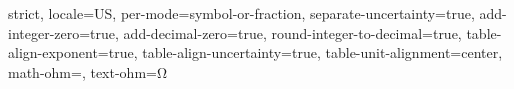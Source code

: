 \NewDocumentCommand \mathdefault {}
{
  \mathit
}



\setlength{\delimitershortfall}{-1sp}

\setlength{\IEEEnormaljot}{10pt}

\sisetup
{
  strict,
  locale=US,
  per-mode=symbol-or-fraction,
  separate-uncertainty=true,
  add-integer-zero=true,
  add-decimal-zero=true,
  round-integer-to-decimal=true,
  table-align-exponent=true,
  table-align-uncertainty=true,
  table-unit-alignment=center,
  math-ohm=\mathup{\Omega},
  text-ohm=\ensuremath{\mathup{\Omega}}
}




\nocite{numpy, scipy, matplotlib, uncertainties, root, roofit}

\NewDocumentCommand \makebibliography {}
{
  \printbibliography[heading=bibintoc]
}

\ExplSyntaxOff
